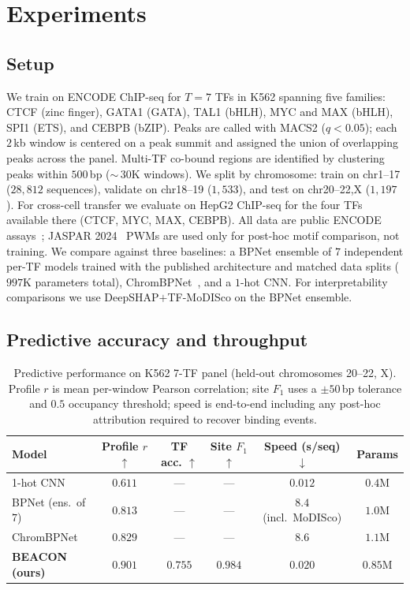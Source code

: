 \documentclass{article}
\begin{document}
\section{Experiments}
\label{sec:experiments}

\subsection{Setup}
We train on ENCODE ChIP-seq for $T{=}7$ TFs in K562 spanning five families: CTCF (zinc finger), GATA1 (GATA), TAL1 (bHLH), MYC and MAX (bHLH), SPI1 (ETS), and CEBPB (bZIP). Peaks are called with MACS2 ($q\!<\!0.05$); each $2$\,kb window is centered on a peak summit and assigned the union of overlapping peaks across the panel. Multi-TF co-bound regions are identified by clustering peaks within $500$\,bp ($\sim$\,$30$K windows). We split by chromosome: train on chr1--17 ($28{,}812$ sequences), validate on chr18--19 ($1{,}533$), and test on chr20--22,X ($1{,}197$). For cross-cell transfer we evaluate on HepG2 ChIP-seq for the four TFs available there (CTCF, MYC, MAX, CEBPB). All data are public ENCODE assays~\citep{encode2012}; JASPAR 2024~\citep{rauluseviciute2024jaspar} PWMs are used only for post-hoc motif comparison, not training. We compare against three baselines: a BPNet ensemble of $7$ independent per-TF models trained with the published architecture and matched data splits ($997$K parameters total), ChromBPNet~\citep{pampari2024chrombpnet}, and a $1$-hot CNN. For interpretability comparisons we use DeepSHAP$+$TF-MoDISco on the BPNet ensemble.

\subsection{Predictive accuracy and throughput}
\begin{table}[t]
\caption{Predictive performance on K562 7-TF panel (held-out chromosomes 20--22, X). Profile $r$ is mean per-window Pearson correlation; site $F_1$ uses a $\pm 50$\,bp tolerance and $0.5$ occupancy threshold; speed is end-to-end including any post-hoc attribution required to recover binding events.}
\label{tab:main}
\centering\small
\begin{tabular}{lccccc}
\toprule
Model & Profile $r$ $\uparrow$ & TF acc. $\uparrow$ & Site $F_1$ $\uparrow$ & Speed (s/seq) $\downarrow$ & Params \\
\midrule
1-hot CNN     & $0.611$ & --- & --- & $0.012$ & $0.4$M \\
BPNet (ens.\ of $7$)  & $0.813$ & ---            & --- & $8.4$ (incl.\ MoDISco) & $1.0$M \\
ChromBPNet    & $0.829$ & ---            & --- & $8.6$               & $1.1$M \\
\textbf{BEACON (ours)} & $\mathbf{0.901}$ & $\mathbf{0.755}$ & $\mathbf{0.984}$ & $\mathbf{0.020}$ & $\mathbf{0.85}$M \\
\bottomrule
\end{tabular}
\end{table}
\end{document}
